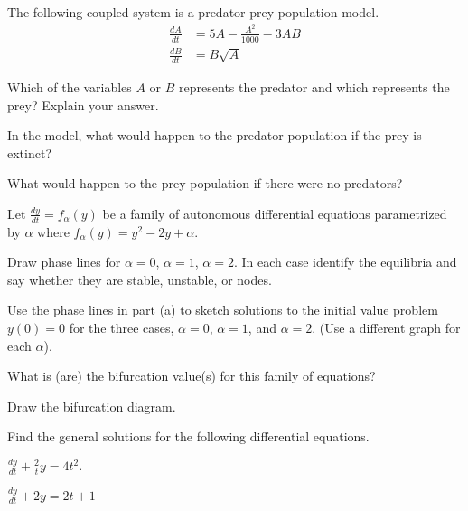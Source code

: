\documentclass[11pt]{exam}
\newcommand{\ds}{\displaystyle}
\begin{document}
\begin{questions}
\question The following coupled system is a predator-prey population model.  
\begin{align*} 
\frac{dA}{dt} &= 5A - \frac{A^2}{1000} - 3AB \\[0.1in]
\frac{dB}{dt} &=  B \sqrt{A}
\end{align*}
\begin{parts}
\item Which of the variables $A$ or $B$ represents the predator and which represents the prey?  Explain your answer.  

\vfill
\item In the model, what would happen to the predator population if the prey is extinct?  
\vfill

\item What would happen to the prey population if there were no predators? 
\vfill

\end{parts}

\newpage
\question Let $\ds{\frac{dy}{dt} = f_{\alpha}(y)}$ be a family of autonomous differential equations parametrized by $\alpha$ where $f_{\alpha}(y) = y^2-2y + \alpha$.
\begin{parts}
\item Draw phase lines for $\alpha = 0$, $\alpha = 1$, $\alpha = 2$.  In each case identify the equilibria and say whether they are stable, unstable, or nodes.   
\vfill

\item Use the phase lines in part (a) to sketch solutions to the initial value problem $y(0) =  0$ for the three cases, $\alpha = 0$, $\alpha=1$, and $\alpha =2$.  (Use a different graph for each $\alpha$).  
\vfill

\item What is (are) the bifurcation value(s) for this family of equations?  
\vfill
\item Draw the bifurcation diagram.  
\vfill 

\end{parts}
\question Find the general solutions for the following differential equations.  
\begin{parts}
\item $\ds{\frac{dy}{dt} + \frac{2}{t}y = 4t^2.}$
\vfill
\item $\ds{\frac{dy}{dt} + 2y = 2t+1}$
\vfill


\end{parts}
\end{questions}
\end{document}
